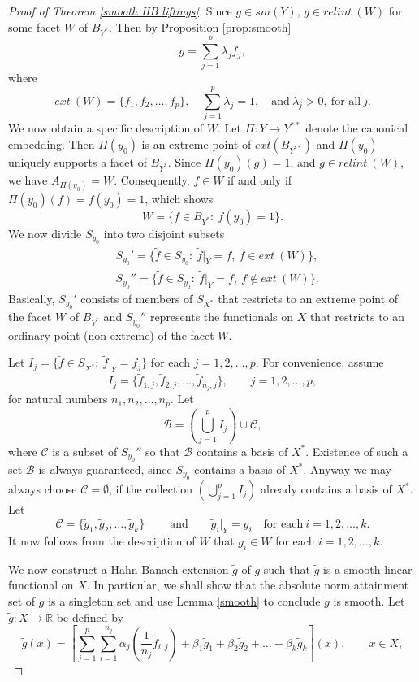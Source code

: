 \documentclass{amsart}
\theoremstyle{definition}
\theoremstyle{remark}
\numberwithin{equation}{section}
\begin{document}
\begin{proof}[Proof of Theorem \ref{smooth HB liftings}]
\noindent Since $g\in sm(Y)$, $g\in relint~(W)$ for some facet $W$ of $B_{Y^*}$. Then by Proposition \ref{prop:smooth}
\[
g = \sum_{j=1}^p\lambda_jf_j,
\]
where 
\[
ext~(W)=\{f_1,f_2,\dots,f_p\}, \quad \sum_{j=1}^p\lambda_j=1, \quad \text{and}~ \lambda_j>0, ~\text{for all}~j.
\]
We now obtain a specific description of $W$. Let $\Pi:Y\to Y^{**}$ denote the canonical embedding. Then $\Pi(y_0)$ is an extreme point of $ext(B_{Y^{**}})$ and $\Pi(y_0)$ uniquely supports a facet of $B_{Y^*}$. Since $\Pi(y_0)(g)=1$, and $g\in relint~(W)$, we have $A_{\Pi(y_0)}=W$. Consequently, $f\in W$ if and only if $\Pi(y_0)(f)=f(y_0)=1$, which shows
\[
W=\{f\in B_{Y^*}:~f(y_0)=1\}.
\]
We now divide $S_{y_0}$ into two disjoint subsets
\begin{align*}
& S_{y_0}'=\{\widetilde{f}\in S_{y_0}:~\widetilde{f}|_Y=f,~f\in ext~(W)\},\\
& S_{y_0}''=\{\widetilde{f}\in S_{y_0}:~\widetilde{f}|_Y=f,~f\notin ext~(W)\}.
\end{align*}
Basically, $S_{y_0}'$ consists of members of $S_{X^*}$ that restricts to an extreme point of the facet $W$ of $B_{Y^*}$ and $S_{y_0}''$ represents the functionals on $X$ that restricts to an ordinary point (non-extreme) of the facet $W$.


\medskip



\noindent Let $I_j=\{\widetilde{f}\in S_{X^*}:~\widetilde{f}|_Y=f_j\}$ for each $j=1,2,\dots,p$. For convenience, assume
\[
I_j=\{\widetilde{f}_{1,j},\widetilde{f}_{2,j},\dots, \widetilde{f}_{n_j,j}\}, \qquad j=1,2,\dots,p,
\]
for natural numbers $n_1,n_2,\dots,n_p$. Let
\[
\mathcal{B}=(\bigcup_{j=1}^p I_j) \cup \mathcal{C},
\]
where $\mathcal{C}$ is a subset of $S_{y_0}''$ so that $\mathcal{B}$ contains a basis of $X^*$. Existence of such a set $\mathcal{B}$ is always guaranteed, since $S_{y_0}$ contains a basis of $X^*$. Anyway we may always choose $\mathcal{C} = \emptyset$, if the collection $(\bigcup_{j=1}^p I_j)$ already contains a basis of $X^*$. Let
\[
\mathcal{C}=\{\widetilde{g}_1,\widetilde{g}_2,\dots, \widetilde{g}_k\}~\qquad \text{and}  \qquad \widetilde{g}_i|_Y=g_i \quad \text{for each}~i=1,2,\dots,k.
\]
It now follows from the description of $W$ that $g_i\in W$ for each $i=1,2,\dots,k$.


\medskip



\noindent We now construct a Hahn-Banach extension $\widetilde{g}$ of $g$ such that $\widetilde{g}$ is a smooth linear functional on $X$. In particular, we shall show that the absolute norm attainment set of $g$ is a singleton set and use Lemma \ref{smooth} to conclude $\widetilde{g}$ is smooth. Let $\widetilde{g}:X\to \mathbb{R}$ be defined by
\[
\widetilde{g}(x)= \left[\sum_{j=1}^p\sum_{i=1}^{n_j}\alpha_j(\frac{1}{n_j}\widetilde{f}_{i,j})+\beta_{1}\widetilde{g}_{1}+\beta_{2}\widetilde{g}_{2}+\dots+\beta_{k}\widetilde{g}_k\right](x), \qquad x\in X,
\]



\end{proof}
\end{document}
